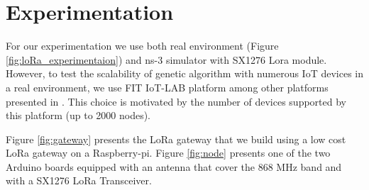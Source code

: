\section{Experimentation} \label{sec:Experimentation}

For our experimentation we use both real environment (Figure \ref{fig:loRa_experimentaion}) and ns-3 simulator with SX1276 Lora module.
However,
	to test the scalability of genetic algorithm with numerous IoT devices in a real environment,
	we use FIT IoT-LAB platform among other platforms presented in \cite{tonneau_how_2015}.
This choice is motivated by the number of devices supported by this platform (up to 2000 nodes).

Figure \ref{fig:gateway} presents the LoRa gateway that we build using a low cost LoRa gateway \cite{lowcostloragateway} on a Raspberry-pi.
Figure \ref{fig:node}  presents one of the two Arduino boards equipped with an antenna that cover the 868 MHz band and with a SX1276 LoRa Transceiver.




